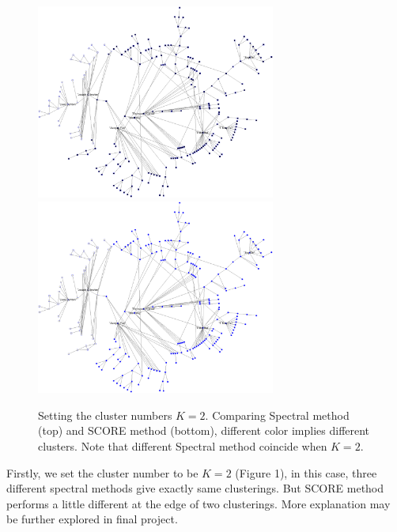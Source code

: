 \documentclass{article}
\numberwithin{equation}{section}
\begin{document}
\begin{figure}[H]
	\centering
	\includegraphics[width=0.7\textwidth]{compare-2/giantcoau-score-2.png}
	\includegraphics[width=0.7\textwidth]{compare-2/giantcoau-spcunl-2.png}
	\caption{Setting the cluster numbers $K=2$. Comparing Spectral method (top) and SCORE method (bottom), different color implies different clusters. Note that different Spectral method coincide when $K=2$. }
\end{figure}

Firstly, we set the cluster number to be $K=2$ (Figure 1), in this case, three different spectral methods give exactly same clusterings. But SCORE method performs a little different at the edge of two clusterings. More explanation may be further explored in final project.
\end{document}
